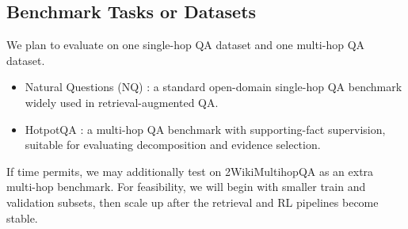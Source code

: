 \subsection{Benchmark Tasks or Datasets}
We plan to evaluate on one single-hop QA dataset and one multi-hop QA dataset.
\begin{itemize}
    \item Natural Questions (NQ) \citep{kwiatkowski-etal-2019-natural}: a standard open-domain single-hop QA benchmark widely used in retrieval-augmented QA.
    \item HotpotQA \citep{yang-etal-2018-hotpotqa}: a multi-hop QA benchmark with supporting-fact supervision, suitable for evaluating decomposition and evidence selection.
\end{itemize}
If time permits, we may additionally test on 2WikiMultihopQA as an extra multi-hop benchmark. For feasibility, we will begin with smaller train and validation subsets, then scale up after the retrieval and RL pipelines become stable.

